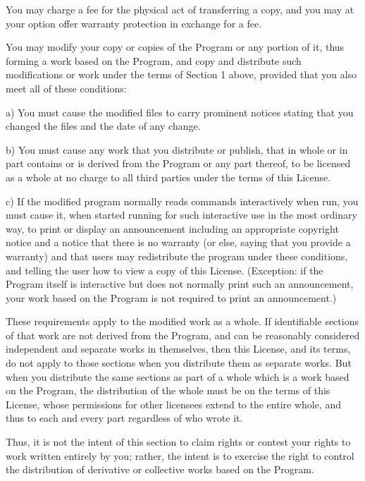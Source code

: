 You may charge a fee for the physical act of transferring a copy, and you may at your option offer warranty protection in exchange for a fee.


\begin{DoxyEnumerate}
\item You may modify your copy or copies of the Program or any portion of it, thus forming a work based on the Program, and copy and distribute such modifications or work under the terms of Section 1 above, provided that you also meet all of these conditions\-: \begin{DoxyVerb}a) You must cause the modified files to carry prominent notices
stating that you changed the files and the date of any change.

b) You must cause any work that you distribute or publish, that in
whole or in part contains or is derived from the Program or any
part thereof, to be licensed as a whole at no charge to all third
parties under the terms of this License.

c) If the modified program normally reads commands interactively
when run, you must cause it, when started running for such
interactive use in the most ordinary way, to print or display an
announcement including an appropriate copyright notice and a
notice that there is no warranty (or else, saying that you provide
a warranty) and that users may redistribute the program under
these conditions, and telling the user how to view a copy of this
License.  (Exception: if the Program itself is interactive but
does not normally print such an announcement, your work based on
the Program is not required to print an announcement.)
\end{DoxyVerb}

\end{DoxyEnumerate}

These requirements apply to the modified work as a whole. If identifiable sections of that work are not derived from the Program, and can be reasonably considered independent and separate works in themselves, then this License, and its terms, do not apply to those sections when you distribute them as separate works. But when you distribute the same sections as part of a whole which is a work based on the Program, the distribution of the whole must be on the terms of this License, whose permissions for other licensees extend to the entire whole, and thus to each and every part regardless of who wrote it.

Thus, it is not the intent of this section to claim rights or contest your rights to work written entirely by you; rather, the intent is to exercise the right to control the distribution of derivative or collective works based on the Program.

